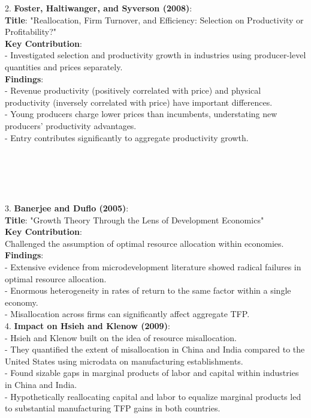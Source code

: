 \documentclass[12pt]{extarticle}
\begin{document}
2. \textbf{Foster, Haltiwanger, and Syverson (2008)}:\\
\textbf{Title}: "Reallocation, Firm Turnover, and Efficiency: Selection on Productivity or Profitability?"\\
\textbf{Key Contribution}:\\
       - Investigated selection and productivity growth in industries using producer-level quantities and prices separately.\\
\textbf{Findings}:\\
       - Revenue productivity (positively correlated with price) and physical productivity (inversely correlated with price) have important differences.\\
       - Young producers charge lower prices than incumbents, understating new producers' productivity advantages.\\
       - Entry contributes significantly to aggregate productivity growth.\\\\\\\\\\\\

3. \textbf{Banerjee and Duflo (2005)}:\\
\textbf{Title}: "Growth Theory Through the Lens of Development Economics"\\
\textbf{Key Contribution}:\\
   Challenged the assumption of optimal resource allocation within economies.\\
\textbf{Findings}:\\
       - Extensive evidence from microdevelopment literature showed radical failures in optimal resource allocation.\\
       - Enormous heterogeneity in rates of return to the same factor within a single economy.\\
       - Misallocation across firms can significantly affect aggregate TFP.\\

4. \textbf{Impact on Hsieh and Klenow (2009)}:\\
   - Hsieh and Klenow built on the idea of resource misallocation.\\
   - They quantified the extent of misallocation in China and India compared to the United States using microdata on manufacturing establishments.\\
   - Found sizable gaps in marginal products of labor and capital within industries in China and India.\\
   - Hypothetically reallocating capital and labor to equalize marginal products led to substantial manufacturing TFP gains in both countries.\\





\end{document}
